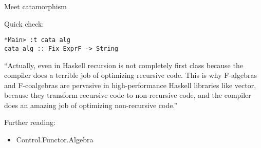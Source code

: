 \documentclass{beamer}
\newcommand{\hin}[2]{}
\begin{document}
\begin{frame}[fragile]{Meet catamorphism}

\hin{110}{110}


\hin{115}{116}

Quick check:

\hin{43}{46}

\begin{verbatim}
*Main> :t cata alg
cata alg :: Fix ExprF -> String
\end{verbatim}
\end{frame}




\begin{frame}
``Actually, even in Haskell recursion is not completely first class because the compiler does a terrible job of optimizing recursive code. This is why F-algebras and F-coalgebras are pervasive in high-performance Haskell libraries like vector, because they transform recursive code to non-recursive code, and the compiler does an amazing job of optimizing non-recursive code.''

\end{frame}
\begin{frame}
Further reading:
\begin{itemize}
\item Control.Functor.Algebra
\end{itemize}
\end{frame}
\end{document}
